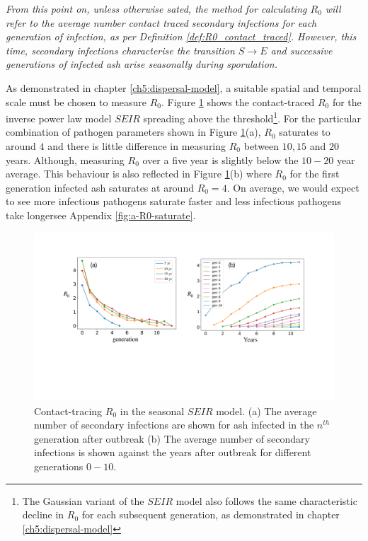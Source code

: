 \textit{From this point on, unless otherwise sated, the method for calculating $R_0$ will refer to the average number contact traced secondary infections for each generation of infection, as per Definition \ref{def:R0_contact_traced}. However, this time, secondary infections characterise the transition $S\rightarrow E$ and successive generations of infected ash arise seasonally during sporulation.}

As demonstrated in chapter \ref{ch5:dispersal-model}, a suitable spatial and temporal scale must be chosen to measure $R_0$. Figure \ref{fig:SEIR-R0-definition} shows the contact-traced $R_0$ for the inverse power law model $SEIR$ spreading above the threshold\footnote{The Gaussian variant of the $SEIR$ model also follows the same characteristic decline in $R_0$ for each subsequent generation, as demonstrated in chapter \ref{ch5:dispersal-model}}. For the particular combination of pathogen parameters shown in Figure \ref{fig:SEIR-R0-definition}(a), $R_0$ saturates to around $4$ and there is little difference in measuring $R_0$ between $10, 15$ and $20$ years. Although, measuring $R_0$ over a five year is slightly below the $10-20$ year average. This behaviour is also reflected in Figure \ref{fig:SEIR-R0-definition}(b) where $R_0$ for the first generation infected ash saturates at around $R_0 = 4$. On average, we would expect to see more infectious pathogens saturate faster and less infectious pathogens take longer\textemdash see Appendix \ref{fig:a-R0-saturate}.

\begin{figure}
    \centering
    \includegraphics[scale=0.3]{chapter6/figures/fig5-R0-def.pdf}
    \caption{Contact-tracing $R_0$ in the seasonal $SEIR$ model. (a) The average number of secondary infections are shown for ash infected in the $n^{th}$ generation after outbreak (b) The average number of secondary infections is shown against the years after outbreak for different generations $0-10$.}
    \label{fig:SEIR-R0-definition}
\end{figure}

